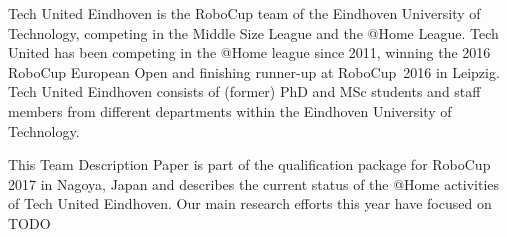 Tech United Eindhoven is the RoboCup team of the Eindhoven University of Technology, competing in the Middle Size League and the @Home League. Tech United has been competing in the @Home league since 2011, winning the 2016 RoboCup European Open and finishing runner-up at RoboCup~2016 in Leipzig.
Tech United Eindhoven consists of (former) PhD and MSc students and staff members from different departments within the Eindhoven University of Technology.

This Team Description Paper is part of the qualification package for RoboCup 2017 in Nagoya, Japan and describes the current status of the @Home activities of Tech United Eindhoven.
Our main research efforts this year have focused on TODO%

